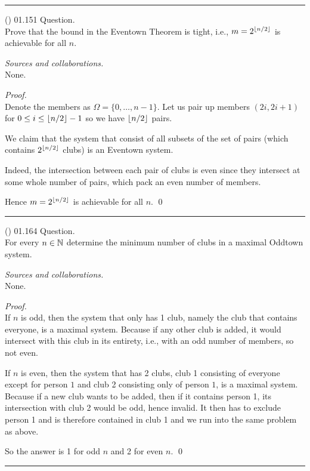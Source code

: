 \documentclass{amsart}
\begin{document}
\bigskip\hrule

\vspace{0.5cm}

\newpage
\Large
{}

\noindent
(\done) 01.151 Question. \\
Prove that the bound in the Eventown Theorem is tight, i.e., $m = 2^{\lfloor n/2\rfloor}$ is achievable for all $n$.

\medskip\noindent
\emph{Sources and collaborations.}\\
None.

\medskip\noindent
\emph{Proof.}\\
Denote the members as $\Omega = \{0, \ldots, n-1\}$. Let us pair up members $(2i, 2i+1)$ for $0 \leq i \leq \lfloor n/2\rfloor -1$ so we have $\lfloor n/2\rfloor$ pairs.

We claim that the system that consist of all subsets of the set of pairs (which contains $2^{\lfloor n/2\rfloor}$ clubs) is an Eventown system.

Indeed, the intersection between each pair of clubs is even since they intersect at some whole number of pairs, which pack an even number of members.

Hence $m = 2^{\lfloor n/2\rfloor}$ is achievable for all $n$.
\qed

\bigskip\hrule

\vspace{0.5cm}

\newpage
\Large
{}

\noindent
(\done) 01.164 Question. \\
For every $n \in \mathbb{N}$ determine the minimum number of clubs in a maximal Oddtown system.

\medskip\noindent
\emph{Sources and collaborations.}\\
None.

\medskip\noindent
\emph{Proof.}\\
If $n$ is odd, then the system that only has 1 club, namely the club that contains everyone, is a maximal system. Because if any other club is added, it would intersect with this club in its entirety, i.e., with an odd number of members, so not even.

If $n$ is even, then the system that has 2 clubs, club 1 consisting of everyone except for person $1$ and club 2 consisting only of person $1$, is a maximal system. Because if a new club wants to be added, then if it contains person 1, its intersection with club 2 would be odd, hence invalid. It then has to exclude person 1 and is therefore contained in club 1 and we run into the same problem as above.

So the answer is 1 for odd $n$ and 2 for even $n$.
\qed

\bigskip\hrule

\vspace{0.5cm}
\end{document}
